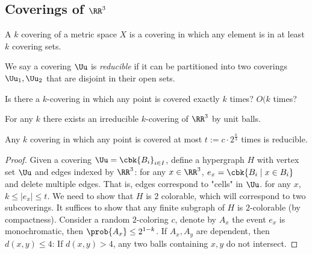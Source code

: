 \documentclass[a4paper, 11pt, oneside]{book}
\begin{document}
\subsection{Coverings of $\RR^3$}
\begin{yellowBox}
	\begin{defn}
		[$k$-covering] A $k$ covering of a metric space $X$ is a covering in which any element is in at least $k$ covering sets.
	\end{defn}
	\begin{defn}
		[Reducible] We say a covering $\Uu$ is \emph{reducible} if it can be partitioned into two coverings $\Uu_1,\Uu_2$ that are disjoint in their open sets.
	\end{defn}
\end{yellowBox}
\begin{question}
	Is there a $k$-covering in which any point is covered exactly $k$ times? $O(k$ times?
\end{question}
\begin{thm}
	 For any $k$ there exists an irreducible $k$-covering of $\RR^3$ by unit balls.
\end{thm}
\begin{thm}
	Any $k$ covering in which any point is covered at most $t:= c\cdot 2^{\frac{k}{3}}$ times is reducible.
\end{thm}
\begin{proof}
	Given a covering $\Uu = \cbk{B_i}_{i\in I}$, define a hypergraph $H$ with vertex set $\Uu$ and edges indexed by $\RR^3$: for any $x\in \RR^3$, $e_x = \cbk{B_i\mid x\in B_i}$ and delete multiple edges. That is, edges correspond to "cells" in $\Uu$. for any $x$, $k\le |e_x|\le t$. We need to show that $H$ is $2$ colorable, which will correspond to two subcoverings. It suffices to show that any finite subgraph of $H$ is $2$-colorable (by compactness). Consider a random $2$-coloring $c$, denote by $A_x$ the event $e_x$ is monochromatic, then $\prob{A_x}\le 2^{1-k}$. If $A_x,A_y$ are dependent, then $d(x,y) \le 4$: If $d(x,y) > 4$, any two balls containing $x,y$ do not intersect.
\end{proof}
\end{document}
